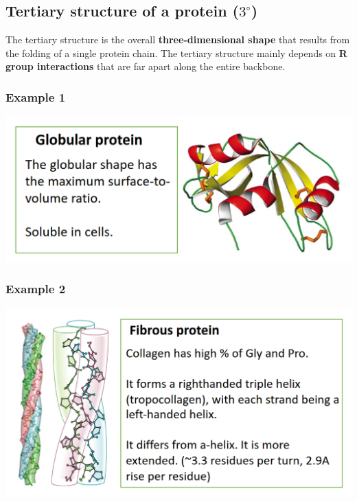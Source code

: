 \documentclass[11pt]{article}
\begin{document}
\newpage

\subsection{Tertiary structure of a protein (\(3^{\circ}\))}
\label{sec:org52dfef4}
The tertiary structure is the overall \textbf{three-dimensional shape} that results from the folding of a single protein chain. The tertiary structure mainly depends on \textbf{R group interactions} that are far apart along the entire backbone.

\subsubsection{Example 1}
\label{sec:org6556ec4}
\begin{center}
\includegraphics[width=.9\linewidth]{./images/globular-protein.png}
\end{center}

\subsubsection{Example 2}
\label{sec:org21f01b4}
\begin{center}
\includegraphics[width=.9\linewidth]{./images/fibrous-protein.png}
\end{center}

\newpage
\end{document}
